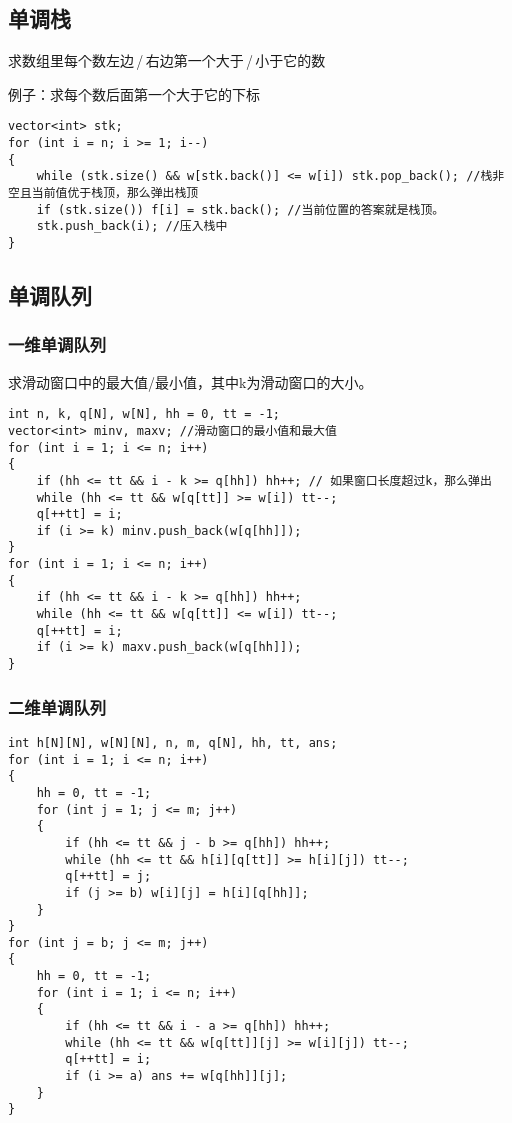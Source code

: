 \documentclass[a4paper,fontset=none]{ctexart}
\begin{document}
\subsection{单调栈}

求数组里每个数左边\,/\,右边第一个大于\,/\,小于它的数

例子：求每个数后面第一个大于它的下标
\begin{verbatim}
vector<int> stk;
for (int i = n; i >= 1; i--)
{
    while (stk.size() && w[stk.back()] <= w[i]) stk.pop_back(); //栈非空且当前值优于栈顶，那么弹出栈顶
    if (stk.size()) f[i] = stk.back(); //当前位置的答案就是栈顶。
    stk.push_back(i); //压入栈中
}
\end{verbatim}

\subsection{单调队列}
\subsubsection{一维单调队列}

求滑动窗口中的最大值/最小值，其中k为滑动窗口的大小。
\begin{verbatim}
int n, k, q[N], w[N], hh = 0, tt = -1;
vector<int> minv, maxv; //滑动窗口的最小值和最大值
for (int i = 1; i <= n; i++)
{
    if (hh <= tt && i - k >= q[hh]) hh++; // 如果窗口长度超过k，那么弹出
    while (hh <= tt && w[q[tt]] >= w[i]) tt--;
    q[++tt] = i;
    if (i >= k) minv.push_back(w[q[hh]]);
}
for (int i = 1; i <= n; i++)
{
    if (hh <= tt && i - k >= q[hh]) hh++;
    while (hh <= tt && w[q[tt]] <= w[i]) tt--;
    q[++tt] = i;
    if (i >= k) maxv.push_back(w[q[hh]]);
}
\end{verbatim}
\subsubsection{二维单调队列}
\begin{verbatim}
int h[N][N], w[N][N], n, m, q[N], hh, tt, ans;
for (int i = 1; i <= n; i++)
{
    hh = 0, tt = -1;
    for (int j = 1; j <= m; j++)
    {
        if (hh <= tt && j - b >= q[hh]) hh++;
        while (hh <= tt && h[i][q[tt]] >= h[i][j]) tt--;
        q[++tt] = j;
        if (j >= b) w[i][j] = h[i][q[hh]];
    }
}
for (int j = b; j <= m; j++)
{
    hh = 0, tt = -1;
    for (int i = 1; i <= n; i++)
    {
        if (hh <= tt && i - a >= q[hh]) hh++;
        while (hh <= tt && w[q[tt]][j] >= w[i][j]) tt--;
        q[++tt] = i;
        if (i >= a) ans += w[q[hh]][j];
    }
}
\end{verbatim}
\end{document}
